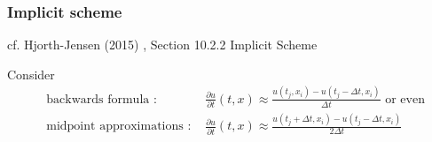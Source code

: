 \documentclass[10pt]{amsart}
\begin{document}
\begin{multicols*}{2}
\subsubsection{Implicit scheme}
cf. Hjorth-Jensen (2015) \cite{Hjor2015}, Section 10.2.2 Implicit Scheme

Consider
\begin{equation}
\begin{aligned}
  & \text{ backwards formula : }       & \frac{ \partial u }{ \partial t}(t,x) \approx \frac{ u(t_j,x_i) - u(t_j-\Delta t, x_i) }{ \Delta t} \text{ or even } \\
  & \text{ midpoint approximations : } &  \frac{ \partial u }{ \partial t}(t,x) \approx \frac{ u(t_j + \Delta t,x_i) - u(t_j-\Delta t, x_i) }{ 2 \Delta t}
\end{aligned}
\end{equation}


\end{multicols*}
\end{document}
